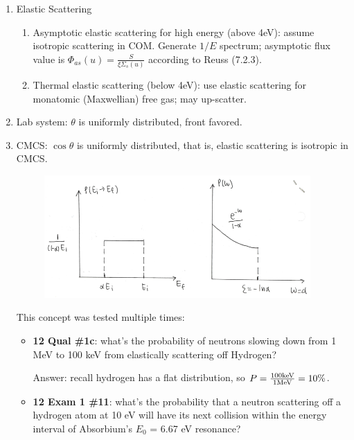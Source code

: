 \documentclass{school-22.211-notes}
\begin{document}
\clearpage
{} 
\begin{enumerate}
\item Elastic Scattering
  \begin{enumerate}
  \item Asymptotic elastic scattering for high energy (above 4eV): assume isotropic scattering in COM. Generate $1/E$ spectrum; asymptotic flux value is $\Phi_{as} (u) = \frac{S}{\xi \Sigma_s (u)}$ according to Reuss (7.2.3). 
  \item Thermal elastic scattering (below 4eV): use elastic scattering for monatomic (Maxwellian) free gas; may up-scatter. 
  \end{enumerate}

\item Lab system: $\theta$ is uniformly distributed, front favored. 

\item CMCS: $\cos \theta$ is uniformly distributed, that is, elastic scattering is isotropic in CMCS. 
  \begin{figure}[ht]
    \centering
    \includegraphics[width=4in]{images/sl-d/prob.png}
  \end{figure}


  This concept was tested multiple times:
  \begin{itemize}
    \item  \textbf{12 Qual \#1c}: what's the probability of neutrons slowing down from 1 MeV to 100 keV from elastically scattering off Hydrogen? 

      Answer: recall hydrogen has a flat distribution, so $P = \frac{100 \mathrm{keV}}{1 \mathrm{MeV}} = 10\%$. 
    \item \textbf{12 Exam 1 \#11}: what's the probability that a neutron scattering off a hydrogen atom at 10 eV will have its next collision within the energy interval of Absorbium's $E_0$ = 6.67 eV resonance? 


\end{itemize}
\end{enumerate}
\end{document}
